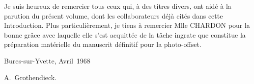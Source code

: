 Je suis heureux de remercier tous ceux qui, \`a des titres divers, ont aid\'e \`a la parution du pr\'esent volume, dont les collaborateurs d\'ej\`a cit\'es dans cette Introduction. Plus particuli\`erement, je tiens \`a remercier Mlle CHARDON pour la bonne gr\^ace avec laquelle elle s'est acquitt\'ee de la t\^ache ingrate que constitue la pr\'eparation mat\'erielle du manuscrit d\'efinitif pour la photo-offset.

\bigskip\hfill Bures-sur-Yvette, Avril~1968
\par\smallskip \hfill A.\, Grothendieck.

